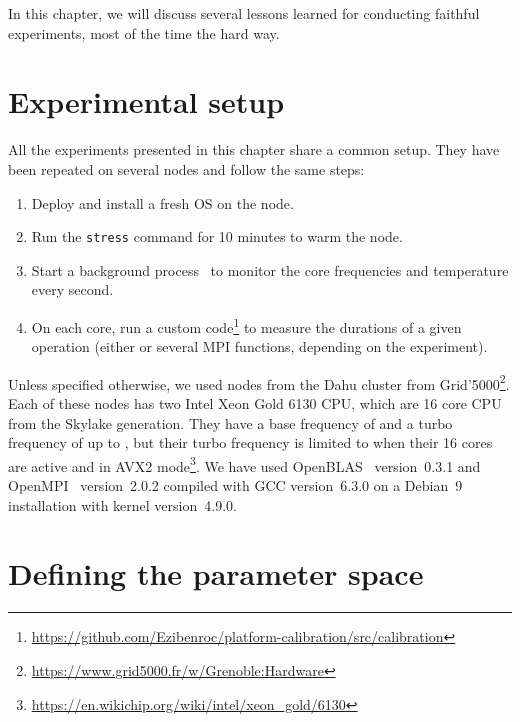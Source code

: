     In this chapter, we will discuss several lessons learned for conducting faithful experiments, most of the time the
    hard way.

    \section{Experimental setup}%
    \label{sec:experimental_setup}

        All the experiments presented in this chapter share a common setup. They have been repeated on several nodes and
        follow the same steps:
        \begin{enumerate}
            \item Deploy and install a fresh OS on the node.
            \item Run the \texttt{stress} command for 10 minutes to warm the node.
            \item Start a background process~\cite{ratatouille} to monitor the core frequencies and temperature every
                second.
            \item On each core, run a custom
                code\footnote{\url{https://github.com/Ezibenroc/platform-calibration/src/calibration}}
                to measure the durations of a given operation (either \dgemm or several MPI functions, depending
                on the experiment).
        \end{enumerate}

        Unless specified otherwise, we used nodes from the Dahu cluster from
        Grid'5000\footnote{\url{https://www.grid5000.fr/w/Grenoble:Hardware}}. Each of these nodes has two Intel Xeon
        Gold 6130 CPU, which are 16 core CPU from the Skylake generation. They have a base frequency of
         and a turbo frequency of up to , but their turbo frequency is
        limited to  when their 16 cores are active and in AVX2
        mode\footnote{\url{https://en.wikichip.org/wiki/intel/xeon\_gold/6130}}. We have used
        OpenBLAS~\cite{openblas} version~0.3.1 and OpenMPI~\cite{openmpi} version~2.0.2 compiled with GCC version~6.3.0
        on a Debian~9 installation with kernel version~4.9.0.

    \section{Defining the parameter space}%
    \label{sec:parameter_space}

